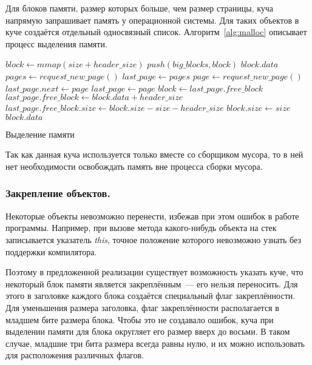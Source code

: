 Для блоков памяти, размер которых больше, чем размер страницы, куча напрямую запрашивает память у операционной системы. Для таких объектов в куче создаётся отдельный односвязный список.
Алгоритм~\ref{alg:malloc} описывает процесс выделения памяти. 

\begin{algorithm}[h]
\begin{algorithmic}[1]
    \State $block \gets mmap(size + header\_size)$
    \State $push(big\_blocks, block)$
    \State \Return $block.data$
\EndIf
{}
    \State $pages \gets request\_new\_page()$
    \State $last\_page \gets pages$
\EndIf
{}
    \State $page \gets request\_new\_page()$
    \State $last\_page.next \gets page$
    \State $last\_page \gets page$
\EndIf
\State $block \gets last\_page.free\_block$
\State $last\_page.free\_block \gets block.data + header\_size$
\State $last\_page.free\_block.size \gets block.size - size - header\_size$
\State $block.size \gets size$
\State \Return $block.data$
\end{algorithmic}
\caption{Выделение памяти}\label{alg:malloc}
\end{algorithm}

Так как данная куча используется только вместе со сборщиком мусора, то в ней нет необходимости освобождать память вне процесса сборки мусора.

\subsubsection{Закрепление объектов.}
Некоторые объекты невозможно перенести, избежав при этом ошибок в работе программы. Например, при вызове метода какого-нибудь объекта на стек записывается указатель \textit{this}, точное положение которого невозможно узнать без поддержки компилятора.

Поэтому в предложенной реализации существует возможность указать куче, что некоторый блок памяти является закреплённым~--- его нельзя переносить.
Для этого в заголовке каждого блока создаётся специальный флаг закреплённости.
Для уменьшения размера заголовка, флаг закреплённости располагается в младшем бите размера блока. Чтобы это не создавало ошибок, куча при выделении памяти для блока округляет его размер вверх до восьми. В таком случае, младшие три бита размера всегда равны нулю, и их можно использовать для расположения различных флагов.
